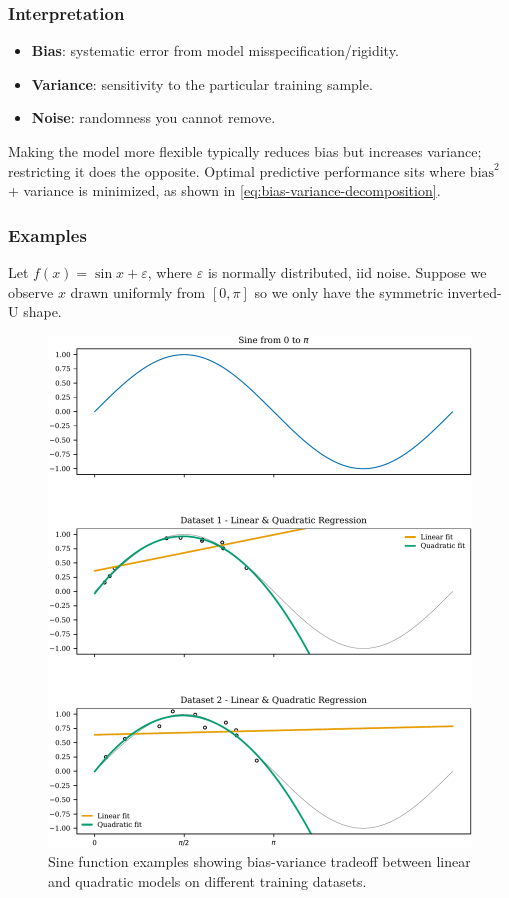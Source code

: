 \subsubsection{Interpretation}

\begin{itemize}
\item \textbf{Bias}: systematic error from model misspecification/rigidity.
\item \textbf{Variance}: sensitivity to the particular training sample.
\item \textbf{Noise}: randomness you cannot remove.
\end{itemize}

Making the model more flexible typically reduces bias but increases variance; restricting it does the opposite. Optimal predictive performance sits where $\mathrm{bias}^2$ + variance is minimized, as shown in \cref{eq:bias-variance-decomposition}.

\subsubsection{Examples}

Let $f(x) = \sin x + \varepsilon$, where $\varepsilon$ is normally distributed, iid noise. Suppose we observe $x$ drawn uniformly from $[0,\pi]$ so we only have the symmetric inverted-U shape.

\begin{figure}[H]
\centering
\includegraphics[width=\textwidth]{images/sine_examples.pdf}
\caption{Sine function examples showing bias-variance tradeoff between linear and quadratic models on different training datasets.}
\end{figure}

